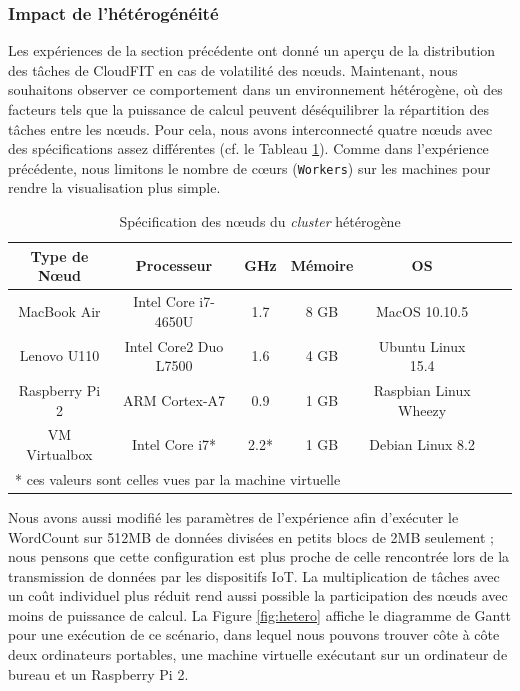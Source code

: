 \subsubsection{Impact de l'hétérogénéité\label{subsubsec:cloudfit-heterogene}}

Les expériences de la section précédente ont donné un aperçu de la distribution des tâches de CloudFIT en cas de volatilité des n{\oe}uds. Maintenant, nous souhaitons observer ce comportement dans un environnement hétérogène, où des facteurs tels que la puissance de calcul peuvent déséquilibrer la répartition des tâches entre les n{\oe}uds. Pour cela, nous avons interconnecté quatre n{\oe}uds avec des spécifications assez différentes (cf. le Tableau \ref{Table:laptops}). Comme dans l'expérience précédente, nous limitons le nombre de c{\oe}urs (\texttt{Workers}) sur les machines pour rendre la visualisation plus simple.

\begin{table}
	\begin{center}
		\begin{tabular}{|c|c|c|c|c|c|c|}
			\hline
			Type de N{\oe}ud & Processeur & GHz &  Mémoire & OS\\
			\hline
			\hline
			MacBook Air & Intel Core i7-4650U & 1.7   & 8 GB & MacOS 10.10.5 \\
			Lenovo U110 & Intel Core2 Duo L7500 & 1.6   & 4 GB & Ubuntu Linux 15.4 \\
			Raspberry Pi 2 & ARM Cortex-A7 & 0.9  & 1 GB & Raspbian Linux Wheezy\\
			VM Virtualbox & Intel Core i7* & 2.2*  &  1 GB & Debian Linux 8.2 \\
			\hline
			\multicolumn{5}{l}{* ces valeurs sont celles vues par la machine virtuelle}
		\end{tabular}
	\end{center}
	\caption{\label{Table:laptops}Spécification des n{\oe}uds du \textit{cluster} hétérogène}
\end{table} 

Nous avons aussi modifié les paramètres de l'expérience afin d'exécuter le WordCount sur 512MB de données divisées en petits blocs de 2MB seulement ; nous pensons que cette configuration est plus proche de celle rencontrée lors de la transmission de données par les dispositifs IoT. La multiplication de tâches avec un coût individuel plus réduit rend aussi possible la participation des n{\oe}uds avec moins de puissance de calcul.  La Figure \ref{fig:hetero} affiche le diagramme de Gantt pour une exécution de ce scénario, dans lequel nous pouvons trouver côte à côte deux ordinateurs portables, une machine virtuelle exécutant sur un ordinateur de bureau et un Raspberry Pi 2. 

